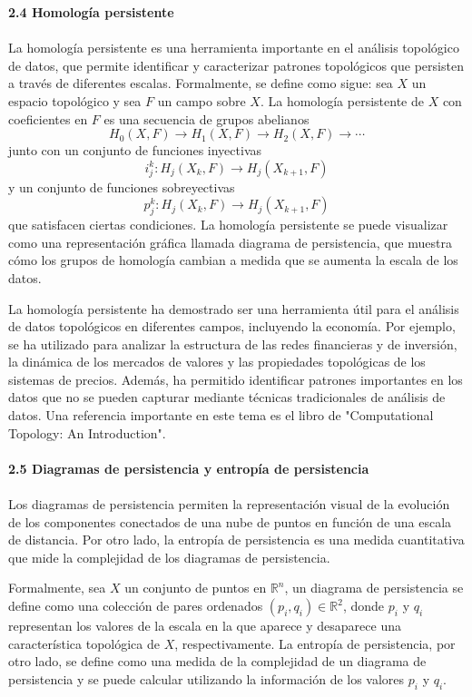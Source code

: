 \textbf{2.4 Homología persistente}\\\\
La homología persistente es una herramienta importante en el análisis topológico de datos, que permite identificar y caracterizar patrones topológicos que persisten a través de diferentes escalas. Formalmente, se define como sigue: sea $X$ un espacio topológico y sea $F$ un campo sobre $X$. La homología persistente de $X$ con coeficientes en $F$ es una secuencia de grupos abelianos 
$$H_0(X,F) \to H_1(X,F) \to H_2(X,F) \to \cdots$$ 
junto con un conjunto de funciones inyectivas 
$$i_j^k: H_j(X_k,F) \to H_j(X_{k+1},F)$$ 
y un conjunto de funciones sobreyectivas 
$$p_j^k: H_j(X_k,F) \to H_j(X_{k+1},F)$$ 
que satisfacen ciertas condiciones. La homología persistente se puede visualizar como una representación gráfica llamada diagrama de persistencia, que muestra cómo los grupos de homología cambian a medida que se aumenta la escala de los datos.

La homología persistente ha demostrado ser una herramienta útil para el análisis de datos topológicos en diferentes campos, incluyendo la economía. Por ejemplo, se ha utilizado para analizar la estructura de las redes financieras y de inversión, la dinámica de los mercados de valores y las propiedades topológicas de los sistemas de precios. Además, ha permitido identificar patrones importantes en los datos que no se pueden capturar mediante técnicas tradicionales de análisis de datos. Una referencia importante en este tema es el libro de \cite{books/daglib/0025666} "Computational Topology: An Introduction".\\\\



\textbf{2.5 Diagramas de persistencia y entropía de persistencia}\\\\
Los diagramas de persistencia permiten la representación visual de la evolución de los componentes conectados de una nube de puntos en función de una escala de distancia. Por otro lado, la entropía de persistencia es una medida cuantitativa que mide la complejidad de los diagramas de persistencia.

Formalmente, sea $X$ un conjunto de puntos en $\mathbb{R}^n$, un diagrama de persistencia se define como una colección de pares ordenados $(p_i, q_i) \in \mathbb{R}^2$, donde $p_i$ y $q_i$ representan los valores de la escala en la que aparece y desaparece una característica topológica de $X$, respectivamente. La entropía de persistencia, por otro lado, se define como una medida de la complejidad de un diagrama de persistencia y se puede calcular utilizando la información de los valores $p_i$ y $q_i$.

